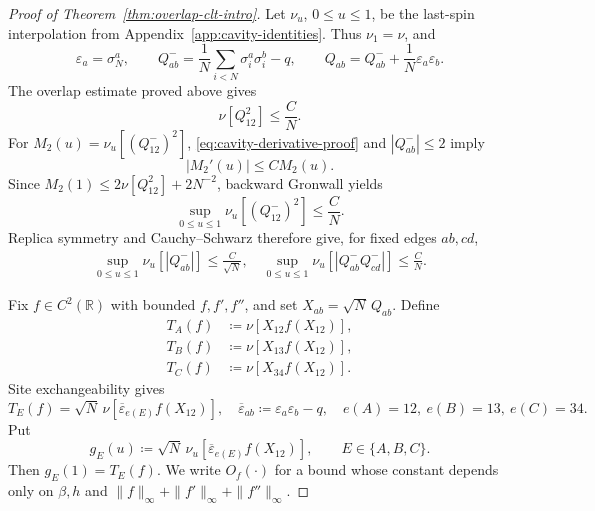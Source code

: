 \documentclass[11pt]{article}
\numberwithin{equation}{section}
\newcommand{\1}{\mathbf 1}
\begin{document}
\begin{proof}[Proof of Theorem~\ref{thm:overlap-clt-intro}]
Let $\nu_u$, $0\le u\le1$, be the last-spin interpolation from
Appendix~\ref{app:cavity-identities}.  Thus $\nu_1=\nu$, and
\[
 \varepsilon_a=\sigma_N^a,\qquad
 Q^-_{ab}=\frac1N\sum_{i<N}\sigma_i^a\sigma_i^b-q,\qquad
 Q_{ab}=Q^-_{ab}+\frac1N\varepsilon_a\varepsilon_b.
\]
The overlap estimate proved above gives
\begin{equation}
 \nu[Q_{12}^2]\le\frac{C}{N}.
 \label{eq:clt-endpoint-second-moment}
\end{equation}
For $M_2(u)=\nu_u[(Q^-_{12})^2]$,
\eqref{eq:cavity-derivative-proof} and $|Q^-_{ab}|\le2$ imply
\begin{equation}
 |M_2'(u)|\le C M_2(u).
 \label{eq:clt-M2-differential}
\end{equation}
Since $M_2(1)\le2\nu[Q_{12}^2]+2N^{-2}$, backward Gronwall yields
\begin{equation}
 \sup_{0\le u\le1}\nu_u[(Q^-_{12})^2]\le\frac{C}{N}.
 \label{eq:clt-uniform-cavity-second}
\end{equation}
Replica symmetry and Cauchy--Schwarz therefore give, for fixed edges
$ab,cd$,
\begin{align}
 \sup_{0\le u\le1}\nu_u[|Q^-_{ab}|]
 \le\frac{C}{\sqrt N},
\quad  \sup_{0\le u\le1}\nu_u[|Q^-_{ab}Q^-_{cd}|]
 \le\frac{C}{N}.
 \label{eq:clt-cavity-product}
\end{align}

Fix $f\in C^2(\mathbb R)$ with bounded $f,f',f''$, and set
$X_{ab}=\sqrt N\,Q_{ab}$.  Define
\begin{align}
 T_A(f)&\coloneqq\nu[X_{12}f(X_{12})],
 \label{eq:clt-TA}\\
 T_B(f)&\coloneqq\nu[X_{13}f(X_{12})],
 \label{eq:clt-TB}\\
 T_C(f)&\coloneqq\nu[X_{34}f(X_{12})].
 \label{eq:clt-TC}
\end{align}
Site exchangeability gives
\begin{equation}
 T_E(f)=\sqrt N\,\nu[
 \overline\varepsilon_{e(E)}f(X_{12})],
 \quad
 \overline\varepsilon_{ab}\coloneqq\varepsilon_a\varepsilon_b-q,
 \quad
 e(A)=12,\ e(B)=13,\ e(C)=34.
 \label{eq:clt-site-exchangeability}
\end{equation}
Put
\[
 g_E(u)\coloneqq
 \sqrt N\,\nu_u[\overline\varepsilon_{e(E)}f(X_{12})],
 \qquad E\in\{A,B,C\}.
\]
Then $g_E(1)=T_E(f)$.  We write $O_f(\cdot)$ for a bound whose constant
depends only on $\beta,h$ and
$\|f\|_\infty+\|f'\|_\infty+\|f''\|_\infty$.


\end{proof}
\end{document}
